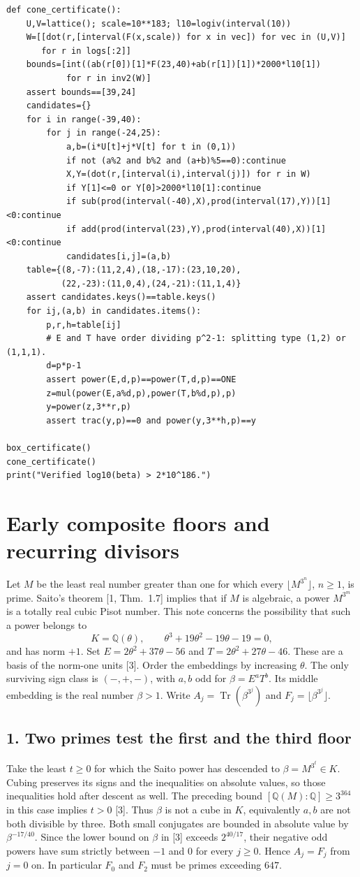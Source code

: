 \documentclass[11pt,a4paper,oneside,openany]{book}
\newcommand{\Q}{\mathbb Q}\newcommand{\C}{\mathbb C}\newcommand{\Z}{\mathbb Z}\newcommand{\F}{\mathbb F}\newcommand{\Tr}{\operatorname{Tr}}\newcommand{\Nm}{\operatorname{N}}\newcommand{\ord}{\operatorname{ord}}\newcommand{\K}{K}\newcommand{\OO}{\mathcal O_K}\newcommand{\unit}{\mathcal U}
\newcommand{\localhead}[1]{\needspace{5\baselineskip}\section*{\color{ink}#1}}
\let\sect\localhead\let\secx\localhead\let\head\localhead
\begin{document}
\begin{Verbatim}[fontsize=\footnotesize,breaklines,breakanywhere]
def cone_certificate():
    U,V=lattice(); scale=10**183; l10=logiv(interval(10))
    W=[[dot(r,[interval(F(x,scale)) for x in vec]) for vec in (U,V)]
       for r in logs[:2]]
    bounds=[int((ab(r[0])[1]*F(23,40)+ab(r[1])[1])*2000*l10[1])
            for r in inv2(W)]
    assert bounds==[39,24]
    candidates={}
    for i in range(-39,40):
        for j in range(-24,25):
            a,b=(i*U[t]+j*V[t] for t in (0,1))
            if not (a%2 and b%2 and (a+b)%5==0):continue
            X,Y=(dot(r,[interval(i),interval(j)]) for r in W)
            if Y[1]<=0 or Y[0]>2000*l10[1]:continue
            if sub(prod(interval(-40),X),prod(interval(17),Y))[1]<0:continue
            if add(prod(interval(23),Y),prod(interval(40),X))[1]<0:continue
            candidates[i,j]=(a,b)
    table={(8,-7):(11,2,4),(18,-17):(23,10,20),
           (22,-23):(11,0,4),(24,-21):(11,1,4)}
    assert candidates.keys()==table.keys()
    for ij,(a,b) in candidates.items():
        p,r,h=table[ij]
        # E and T have order dividing p^2-1: splitting type (1,2) or (1,1,1).
        d=p*p-1
        assert power(E,d,p)==power(T,d,p)==ONE
        z=mul(power(E,a%d,p),power(T,b%d,p),p)
        y=power(z,3**r,p)
        assert trac(y,p)==0 and power(y,3**h,p)==y

box_certificate()
cone_certificate()
print("Verified log10(beta) > 2*10^186.")
\end{Verbatim}


\chapter{Early composite floors and recurring divisors}\label{ch:early}
Let $M$ be the least real number greater than one for which every $\lfloor M^{3^n}\rfloor$, $n\ge1$, is prime. Saito's theorem [1, Thm.~1.7] implies that if $M$ is algebraic, a power $M^{3^m}$ is a totally real cubic Pisot number. This note concerns the possibility that such a power belongs to
\[
 K=\Q(\theta),\qquad \theta^3+19\theta^2-19\theta-19=0,
\]
and has norm $+1$. Set $E=2\theta^2+37\theta-56$ and $T=2\theta^2+27\theta-46$. These are a basis of the norm-one units [3]. Order the embeddings by increasing $\theta$. The only surviving sign class is $(-,+,-)$, with $a,b$ odd for $\beta=E^aT^b$. Its middle embedding is the real number $\beta>1$. Write $A_j=\Tr(\beta^{3^j})$ and $F_j=\lfloor\beta^{3^j}\rfloor$.

\sect{1. Two primes test the first and the third floor}
Take the least $t\ge0$ for which the Saito power has descended to $\beta=M^{3^t}\in K$. Cubing preserves its signs and the inequalities on absolute values, so those inequalities hold after descent as well. The preceding bound $[\Q(M):\Q]\ge 3^{364}$ in this case implies $t>0$ [3]. Thus $\beta$ is not a cube in $K$, equivalently $a,b$ are not both divisible by three. Both small conjugates are bounded in absolute value by $\beta^{-17/40}$. Since the lower bound on $\beta$ in [3] exceeds $2^{40/17}$, their negative odd powers have sum strictly between $-1$ and $0$ for every $j\ge0$. Hence $A_j=F_j$ from $j=0$ on. In particular $F_0$ and $F_2$ must be primes exceeding $647$.
\end{document}
